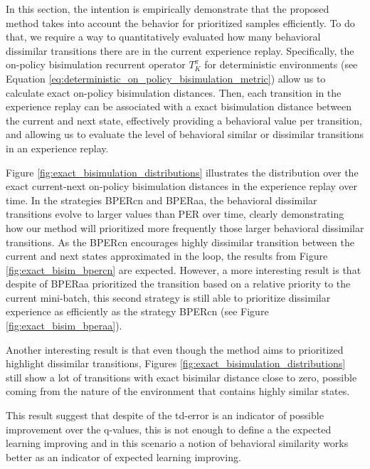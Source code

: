 In this section, the intention is empirically demonstrate that the proposed method takes into account the behavior for prioritized samples efficiently. To do that, we require a way to quantitatively evaluated how many behavioral dissimilar transitions there are in the current experience replay. Specifically, the on-policy bisimulation recurrent operator $T_K^\pi$ for deterministic environments (see Equation \ref{eq:deterministic_on_policy_bisimulation_metric}) allow us to calculate exact on-policy bisimulation distances. Then, each transition in the experience replay can be associated with a exact bisimulation distance between the current and next state, effectively providing a behavioral value per transition, and allowing us to evaluate the level of behavioral similar or dissimilar transitions in an experience replay. 

Figure \ref{fig:exact_bisimulation_distributions} illustrates the distribution over the exact current-next on-policy bisimulation distances in the experience replay over time. In the strategies BPERcn and BPERaa, the behavioral dissimilar transitions evolve to larger values than PER over time, clearly demonstrating how our method will prioritized more frequently those larger behavioral dissimilar transitions. As the BPERcn encourages highly dissimilar transition between the current and next states approximated in the loop, the results from Figure \ref{fig:exact_bisim_bpercn} are expected. However, a more interesting result is that despite of BPERaa prioritized the transition based on a relative priority to the current mini-batch, this second strategy is still able to prioritize dissimilar experience as efficiently as the strategy BPERcn (see Figure \ref{fig:exact_bisim_bperaa}).

Another interesting result is that even though the method aims to prioritized highlight dissimilar transitions, Figures \ref{fig:exact_bisimulation_distributions} still show a lot of transitions with exact bisimilar distance close to zero, possible coming from the nature of the environment that contains highly similar states.

This result suggest that despite of the td-error is an indicator of possible improvement over the q-values, this is not enough to define a the expected learning improving and in this scenario a notion of behavioral similarity works better as an indicator of expected learning improving.


